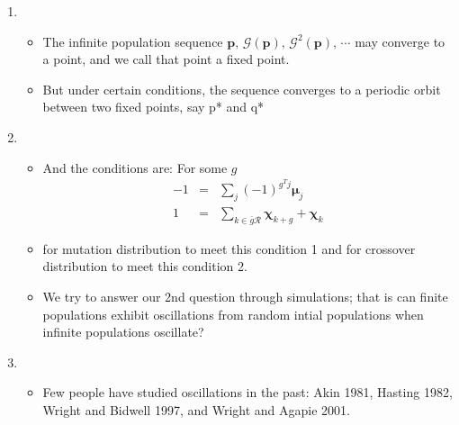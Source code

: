 \documentclass{article}
\begin{document}
\begin{enumerate}
\item
  \begin{itemize}
  \item The infinite population sequence  $\bm{p}, \, \mathcal{G}(\bm{p}), \, {\mathcal{G}}^2(\bm{p}), \, \cdots$ may
    converge to a point, and we call that point a fixed point.
  \item But under certain conditions, the sequence converges to a
    periodic orbit between two fixed points, say p* and q*
\end{itemize}

\item
  \begin{itemize}
  \item And the conditions are: For some $g$
  \begin{eqnarray*}
      -1 &=& \sum \limits_{j} (-1)^{g^T j} \bm{\mu}_j \\
      1 &=& \sum \limits_{k \in \bar{g}\mathcal{R}} \bm{\chi}_{k+g} + \bm{\chi}_k 
      \end{eqnarray*}
  \item for mutation distribution to meet this condition 1 and for crossover  distribution to meet this condition 2.
  \item We try to answer our 2nd question through simulations; that is can finite populations exhibit
     oscillations from random intial populations when infinite populations oscillate?
  \end{itemize}
    
\item
  \begin{itemize}
    \item Few people have studied oscillations in the past: Akin 1981, Hasting 1982, Wright and Bidwell 1997, and Wright and Agapie 2001.
  \end{itemize}


\end{enumerate}
\end{document}
